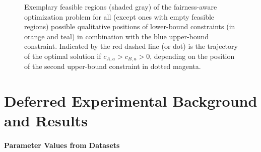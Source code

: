 \documentclass[letterpaper]{article} %
\begin{document}
\begin{figure}
\begin{minipage}{0.48\textwidth}
\end{minipage}
\caption{Exemplary feasible regions (shaded gray) of the fairness-aware optimization problem for all (except ones with empty feasible regions) possible qualitative positions of lower-bound constraints (in orange and teal) in combination with the blue upper-bound constraint. Indicated by the red dashed line (or dot) is the trajectory of the optimal solution if $c_{A,a} > c_{B,a} > 0$, depending on the position of the second upper-bound constraint in dotted magenta.}
\label{fig:graphical_solution}
\end{figure}



\section{Deferred Experimental Background and Results}
\label{app:experimental}

\paragraph{Parameter Values from Datasets}
\end{document}
